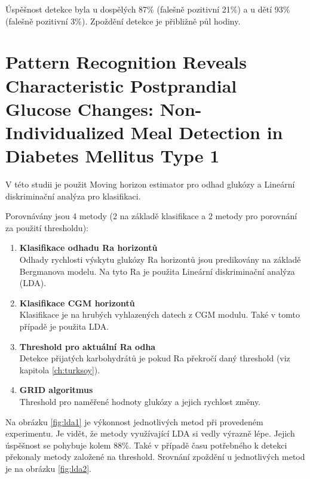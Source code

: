 Úspěšnost detekce byla u dospělých 87\% (falešně pozitivní 21\%) a u dětí 93\% (falešně pozitivní 3\%). Zpoždění detekce je přibližně půl hodiny.


\section{Pattern Recognition Reveals Characteristic Postprandial Glucose Changes: Non-Individualized Meal Detection in Diabetes Mellitus Type 1 \citep{Analyza.LDA}}
\label{ch:lda}

V této studii je použit Moving horizon estimator pro odhad glukózy a Lineární diskriminační analýza pro klasifikaci.

Porovnávány jsou 4 metody (2 na základě klasifikace a 2 metody pro porovnání za použití thresholdu):

\begin{enumerate}
\item \textbf{Klasifikace odhadu Ra horizontů} \\
Odhady rychlosti výskytu glukózy Ra horizontů jsou predikovány na základě Bergmanova modelu. Na tyto Ra je použita Lineární diskriminační analýza (LDA).
\item \textbf{Klasifikace CGM horizontů} \\
Klasifikace je na hrubých vyhlazených datech z CGM modulu. Také v tomto případě je použita LDA.
\item \textbf{Threshold pro aktuální Ra odha} \\
Detekce přijatých karbohydrátů je pokud Ra překročí daný threshold (viz kapitola \ref{ch:turksoy}).
\item \textbf{GRID algoritmus} \\
Threshold pro naměřené hodnoty glukózy a jejich rychlost změny.
\end{enumerate}

Na obrázku \ref{fig:lda1} je výkonnost jednotlivých metod při provedeném experimentu. Je vidět, že metody využívající LDA si vedly výrazně lépe. Jejich úspěšnost se pohybuje kolem 88\%. Také v případě času potřebného k detekci překonaly metody založené na threshold. Srovnání zpoždění u jednotlivých metod je na obrázku \ref{fig:lda2}.

